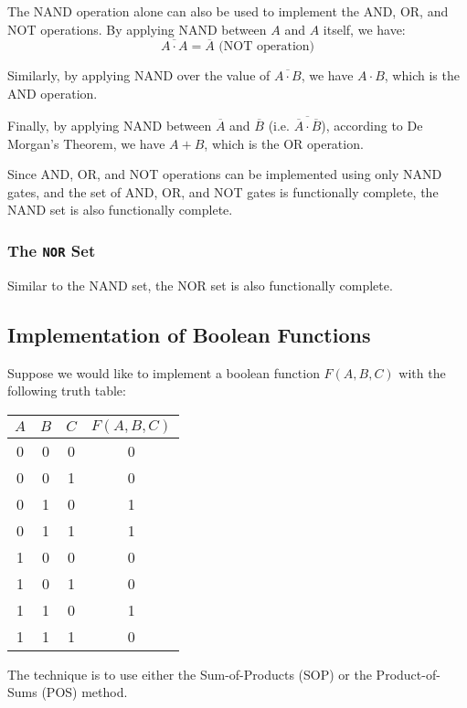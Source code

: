 The NAND operation alone can also be used to implement the AND, OR, and NOT operations.
By applying NAND between $A$ and $A$ itself, we have:
\begin{equation*}
    \overline{A\cdot A} = \overline{A} \text{ (NOT operation)}
\end{equation*}

Similarly, by applying NAND over the value of $\overline{A\cdot B}$, we have $A\cdot B$,
which is the AND operation.

Finally, by applying NAND between $\overline{A}$ and $\overline{B}$
(i.e. $\overline{\overline{A}\cdot\overline{B}}$), according to
De Morgan's Theorem, we have $A+B$, which is the OR operation.

Since AND, OR, and NOT operations can be implemented using only NAND gates,
and the set of AND, OR, and NOT gates is functionally complete, the NAND set is also
functionally complete.

\subsubsection{The \texttt{NOR} Set}

Similar to the NAND set, the NOR set is also functionally complete.

\subsection{Implementation of Boolean Functions}

Suppose we would like to implement a boolean function $F(A, B, C)$ with the following
truth table:

\begin{table}[H]
\centering
\begin{tabular}{|c|c|c||c|}
    \hline
    $A$ & $B$ & $C$ & $F(A, B, C)$ \\
    \hline
    0 & 0 & 0 & 0 \\
    0 & 0 & 1 & 0 \\
    0 & 1 & 0 & 1 \\
    0 & 1 & 1 & 1 \\
    1 & 0 & 0 & 0 \\
    1 & 0 & 1 & 0 \\
    1 & 1 & 0 & 1 \\
    1 & 1 & 1 & 0 \\
    \hline
\end{tabular}
\end{table}
The technique is to use either the Sum-of-Products (SOP) or the Product-of-Sums (POS) method.

